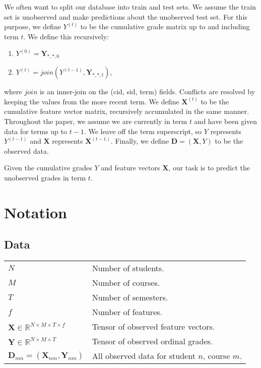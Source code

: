 \documentclass[10pt]{proc}
\begin{document}
We often want to split our database into train and test sets. We assume
the train set is unobserved and make predictions about the unobserved test set.
For this purpose, we define $Y^{(t)}$ to be the cumulative grade matrix up to
and including term $t$. We define this recursively:
%
\begin{enumerate}
    \item  $Y^{(0)} = \bm{Y}_{*,*,0}$
    \item  $Y^{(t)} = join(Y^{(t-1)}, \bm{Y}_{*,*,t})$,
\end{enumerate}
%
where $join$ is an inner-join on the (cid, sid, term) fields. Conflicts are
resolved by keeping the values from the more recent term. We define
$\bm{X}^{(t)}$ to be the cumulative feature vector matrix, recursively
accumulated in the same manner. Throughout the paper, we assume we are
currently in term $t$ and have been given data for terms up to $t-1$. We leave
off the term superscript, so $Y$ represents $Y^{(t-1)}$ and $\bm{X}$ represents
$\bm{X}^{(t-1)}$. Finally, we define $\bm{D} = (\bm{X}, Y)$ to be the observed
data.

Given the cumulative grades $Y$ and feature vectors $\bm{X}$, our task is to
predict the unobserved grades in term $t$.

\section{Notation}

\subsection{Data}

{\footnotesize
\begin{tabular}{p{} p{}}
    $N$         &   Number of students.     \\
    $M$         &   Number of courses.      \\
    $T$         &   Number of semesters.    \\
    $f$         &   Number of features.     \\
    $\bm{X} \in \mathbb{R}^{N \times M \times T \times f}$
                &   Tensor of observed feature vectors. \\
    $\bm{Y} \in \mathbb{R}^{N \times M \times T}$
                &   Tensor of observed ordinal grades.  \\
    $\bm{D}_{nm} = (\bm{X}_{nm}, \bm{Y}_{nm})$
                &   All observed data for student $n$, course $m$.  \\
\end{tabular}}
\end{document}
